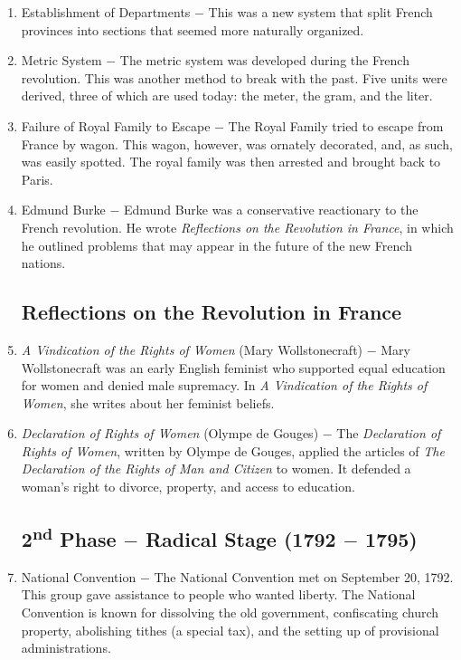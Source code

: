\documentclass[12pt]{article}
\begin{document}
\begin{enumerate}
\item Establishment of Departments $-$ This was a new system that split French provinces into sections that seemed more naturally organized.

\item Metric System $-$ The metric system was developed during the French revolution. This was another method to break with the past. Five units were derived, three of which are used today: the meter, the gram, and the liter.  

\item Failure of Royal Family to Escape $-$ The Royal Family tried to escape from France by wagon. This wagon, however, was ornately decorated, and, as such, was easily spotted. The royal family was then arrested and brought back to Paris.

\item Edmund Burke $-$ Edmund Burke was a conservative reactionary to the French revolution. He wrote \textit{Reflections on the Revolution in France}, in which he outlined problems that may appear in the future of the new French nations.

\subsection{Reflections on the Revolution in France}

\item \textit{A Vindication of the Rights of Women} (Mary Wollstonecraft) $-$ Mary Wollstonecraft was an early English feminist who supported equal education for women and denied male supremacy. In \textit{A Vindication of the Rights of Women}, she writes about her feminist beliefs.

\item \textit{Declaration of Rights of Women} (Olympe de Gouges) $-$ The \textit{Declaration of Rights of Women}, written by Olympe de Gouges, applied the articles of \textit{The Declaration of the Rights of Man and Citizen} to women. It defended a woman's right to divorce, property, and access to education. 

\subsection{2\textsuperscript{nd} Phase $-$ Radical Stage (1792 $-$ 1795)}

\item National Convention $-$ The National Convention met on September 20, 1792. This group gave assistance to people who wanted liberty. The National Convention is known for dissolving the old government, confiscating church property, abolishing tithes (a special tax), and the setting up of provisional administrations.


\end{enumerate}
\end{document}
